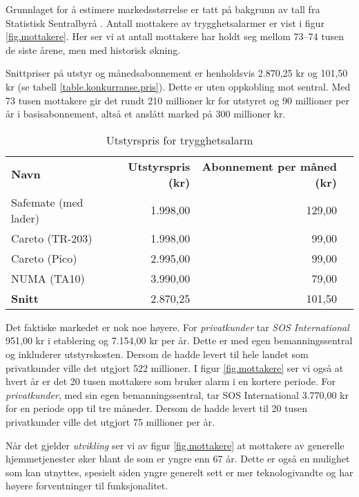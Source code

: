 Grunnlaget for å estimere markedsstørrelse er tatt på bakgrunn av tall fra
Statistisk Sentralbyrå \cite{iplos.2013, ssb.trygghetsalarm}. Antall mottakere
av trygghetsalarmer er vist i figur \vref{fig.mottakere}. Her ser vi at antall
mottakere har holdt seg mellom 73--74 tusen de siste årene, men med historisk
økning.

Snittpriser på utstyr og månedsabonnement er henholdsvis 2.870,25 kr og 101,50
kr (se tabell \vref{table.konkurranse.pris}). Dette er uten oppkobling mot
sentral.  Med 73 tusen mottakere gir det rundt 210 millioner kr for utstyret og
90 millioner per år i basisabonnement, altså et anslått marked på 300 millioner
kr.

\begin{table}
  \centering
  \begin{tabular}{lrrr}
    \textbf{Navn} &
    \textbf{Utstyrspris (kr)} &
    \textbf{Abonnement per måned (kr)}\\
    Safemate (med lader) & 1.998,00 & 129,00 \\
    Careto (TR-203)      & 1.998,00 &  99,00 \\
    Careto (Pico)        & 2.995,00 &  99,00 \\
    NUMA (TA10)          & 3.990,00 &  79,00 \\
    \textbf{Snitt}       & 2.870,25 & 101,50 \\
  \end{tabular}
  \caption{Utstyrspris for trygghetsalarm}
  \label{table.konkurranse.pris}
\end{table}

Det faktiske markedet er nok noe høyere. For \textit{privatkunder} tar
\textit{SOS International} 951,00 kr i etablering og 7.154,00 kr per år. Dette
er med egen bemanningssentral og inkluderer utstyrskosten. Dersom de hadde
levert til hele landet som privatkunder ville det utgjort 522 millioner.  I
figur \vref{fig.mottakere} ser vi også at hvert år er det 20 tusen mottakere
som bruker alarm i en kortere periode. For \textit{privatkunder}, med sin egen
bemanningssentral, tar SOS International 3.770,00 kr for en periode opp til tre
måneder.  Dersom de hadde levert til 20 tusen privatkunder ville det utgjort 75
millioner per år.

Når det gjelder \textit{utvikling} ser vi av figur \vref{fig.mottakere} at
mottakere av generelle hjemmetjenester øker blant de som er yngre enn 67 år.
Dette er også en mulighet som kan utnyttes, spesielt siden yngre generelt sett
er mer teknologivandte og har høyere forventninger til funksjonalitet.

